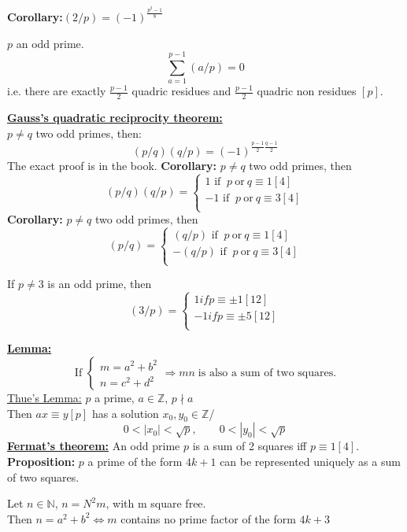 \documentclass{report}
\begin{document}
\textbf{Corollary:}$(2/p)=(-1)^\frac{p^2-1}{8}$
\begin{thm}$p$ an odd prime.
	\[\sum_{a=1}^{p-1} (a/p)=0\]
	i.e. there are exactly $\frac{p-1}{2}$ quadric residues and $\frac{p-1}{2}$ quadric non residues $[p]$.\\
\end{thm}
\underline{\textbf{Gauss's quadratic reciprocity theorem:}}\\
$p\neq q$ two odd primes, then: \[(p/q)(q/p)=(-1)^{\frac{p-1}{2}\frac{q-1}{2}}\]
The exact proof is in the book.
\textbf{Corollary:} $p\neq q$ two odd primes, then \[(p/q)(q/p)=\left \{ 
\begin{array}{lcl}
1 \text{ if }\: p \:\text{or} \:q \equiv 1[4]\\
-1 \text{ if }\: p \:\text{or} \:q \equiv 3[4]\\
\end{array} 
\right.\]
\textbf{Corollary:} $p\neq q$ two odd primes, then	\[(p/q)=\left\{ 
\begin{array}{lcl}
(q/p) \text{ if }\: p \:\text{or} \:q \equiv 1[4]\\
-(q/p) \text{ if }\: p \:\text{or} \:q \equiv 3[4]\\
\end{array}
\right.\]
\begin{thm} If $p\neq 3$ is an odd prime, then \[ (3/p)=\left\{
	\begin{array}{lcl}
	1 if p\equiv \pm 1 [12]\\
	-1 if p\equiv \pm 5 [12]\\
	\end{array}
	\right.\]
\end{thm}
\underline{\textbf{Lemma:}} \[\text{If  }\left\{
\begin{array}{lcl}
m=a^2+b^2\\
n=c^2+d^2
\end{array}
\right. \Rightarrow mn \;\text{is also a sum of two squares.}\]
\underline{Thue's Lemma:} $p$ a prime, $a\in \mathbb{Z}$, $p\nmid a$\\
Then $ax\equiv y [p]$ has a solution $x_0,y_0 \in \mathbb{Z}$/ 
\[0<|x_0|<\sqrt{p},\qquad 0<|y_0|<\sqrt{p}\]
\underline{\textbf{Fermat's theorem:}} An odd prime $p$ is a sum of 2 squares iff $p\equiv 1[4]$.\\
\textbf{Proposition:} $p$ a prime of the form $4k+1$ can be represented uniquely as a sum of two squares.
\begin{thm} Let $n\in \mathbb{N}$, $n=N^2m$, with m square free.\\
	Then $n=a^2+b^2 \iff m$ contains no prime factor of the form $4k+3$
\end{thm}
\end{document}
